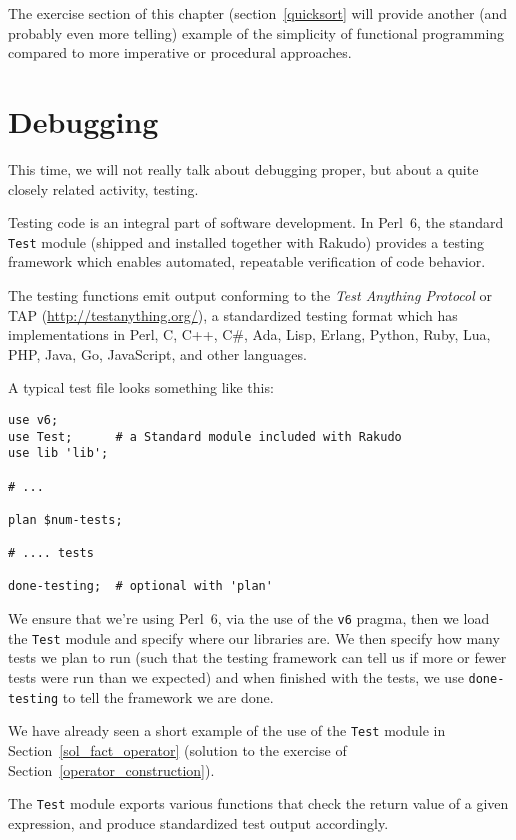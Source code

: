 The exercise section of this chapter (section~\ref{quicksort} 
will provide another (and probably even more telling) example 
of the simplicity of functional programming compared to more 
imperative or procedural approaches.


\section{Debugging}
\label{test_module}

This time, we will not really talk about debugging proper, 
but about a quite closely related activity, testing.

Testing code is an integral part of software development. In 
Perl~6, the standard {\tt Test} module (shipped and installed 
together with Rakudo) provides a testing framework which enables 
automated, repeatable verification of code behavior.

The testing functions emit output conforming to the \emph{Test 
Anything Protocol} or TAP (\url{http://testanything.org/}), a 
standardized testing format which has implementations in Perl, 
C, C++, C\#, Ada, Lisp, Erlang, Python, Ruby, Lua, PHP, Java, 
Go, JavaScript, and other languages.

A typical test file looks something like this:

\begin{verbatim}
use v6;
use Test;      # a Standard module included with Rakudo
use lib 'lib';

# ...

plan $num-tests;

# .... tests

done-testing;  # optional with 'plan'
\end{verbatim}

We ensure that we're using Perl~6, via the use of the \verb'v6' 
pragma, then we load the \verb'Test' module and specify where 
our libraries are. We then specify how many tests we plan 
to run (such that the testing framework can tell us 
if more or fewer tests were run than we expected) 
and when finished with the tests, we use {\tt done-testing} 
to tell the framework we are done.

We have already seen a short example of the use of the 
\verb'Test' module in Section~\ref{sol_fact_operator} 
(solution to the exercise of 
Section~\ref{operator_construction}).

The \verb'Test' module exports various functions that 
check the return value of a given expression, and produce 
standardized test output accordingly.


